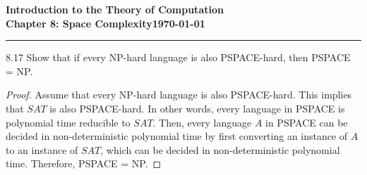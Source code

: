 \documentclass[11pt]{article}
\newcommand{\dated}{\today}
\begin{document}
\textbf{Introduction to the Theory of
Computation}\hfill\textbf{\myname}\\[0.01in]
\textbf{Chapter 8: Space Complexity}\hfill\textbf{\dated}\\
\smallskip\hrule\bigskip

\begin{problem}{8.17}
Show that if every NP-hard language is also PSPACE-hard, then PSPACE = NP.
\end{problem}

\begin{proof}
Assume that every NP-hard language is also PSPACE-hard. This implies that $SAT$ is also PSPACE-hard. In other words, every language in PSPACE is polynomial time reducible to $SAT$. Then, every language $A$ in PSPACE can be decided in non-deterministic polynomial time by first converting an instance of $A$ to an instance of $SAT$, which can be decided in non-deterministic polynomial time. Therefore, PSPACE = NP.
\end{proof}
\end{document}
